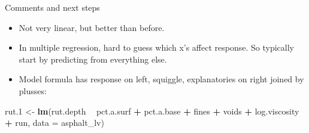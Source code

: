 \documentclass[ignorenonframetext,]{beamer}
\newenvironment{Shaded}{\begin{snugshade}}{\end{snugshade}}
\newcommand{\DataTypeTok}[1]{\textcolor[rgb]{0.13,0.29,0.53}{#1}}
\newcommand{\FloatTok}[1]{\textcolor[rgb]{0.00,0.00,0.81}{#1}}
\newcommand{\KeywordTok}[1]{\textcolor[rgb]{0.13,0.29,0.53}{\textbf{#1}}}
\newcommand{\NormalTok}[1]{#1}
\newcommand{\OperatorTok}[1]{\textcolor[rgb]{0.81,0.36,0.00}{\textbf{#1}}}
\newcommand{\StringTok}[1]{\textcolor[rgb]{0.31,0.60,0.02}{#1}}
\providecommand{\tightlist}{%
  \setlength{\itemsep}{0pt}\setlength{\parskip}{0pt}}
\begin{document}
\begin{frame}[fragile]{Comments and next steps}
\protect\hypertarget{comments-and-next-steps}{}

\begin{itemize}
\tightlist
\item
  Not very linear, but better than before.
\item
  In multiple regression, hard to guess which x's affect response. So
  typically start by predicting from everything else.
\item
  Model formula has response on left, squiggle, explanatories on right
  joined by plusses:
\end{itemize}

\begin{Shaded}
\begin{Highlighting}[]
\NormalTok{rut}\FloatTok{.1}\NormalTok{ <-}\StringTok{ }\KeywordTok{lm}\NormalTok{(rut.depth }\OperatorTok{~}\StringTok{ }\NormalTok{pct.a.surf }\OperatorTok{+}\StringTok{ }\NormalTok{pct.a.base }\OperatorTok{+}\StringTok{ }\NormalTok{fines }\OperatorTok{+}
\StringTok{  }\NormalTok{voids }\OperatorTok{+}\StringTok{ }\NormalTok{log.viscosity }\OperatorTok{+}\StringTok{ }\NormalTok{run, }\DataTypeTok{data =}\NormalTok{ asphalt_lv)}
\end{Highlighting}
\end{Shaded}

\end{frame}
\end{document}
